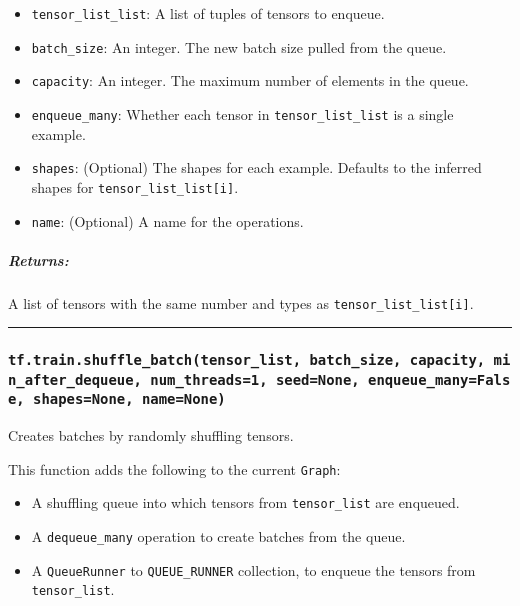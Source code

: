 \begin{itemize}
\tightlist
\item
  \texttt{tensor\_list\_list}: A list of tuples of tensors to enqueue.
\item
  \texttt{batch\_size}: An integer. The new batch size pulled from the
  queue.
\item
  \texttt{capacity}: An integer. The maximum number of elements in the
  queue.
\item
  \texttt{enqueue\_many}: Whether each tensor in
  \texttt{tensor\_list\_list} is a single example.
\item
  \texttt{shapes}: (Optional) The shapes for each example. Defaults to
  the inferred shapes for \texttt{tensor\_list\_list{[}i{]}}.
\item
  \texttt{name}: (Optional) A name for the operations.
\end{itemize}

\subparagraph{Returns: }\label{returns-55}

A list of tensors with the same number and types as
\texttt{tensor\_list\_list{[}i{]}}.

\begin{center}\rule{0.5\linewidth}{\linethickness}\end{center}

\subsubsection{\texorpdfstring{\texttt{tf.train.shuffle\_batch(tensor\_list,\ batch\_size,\ capacity,\ min\_after\_dequeue,\ num\_threads=1,\ seed=None,\ enqueue\_many=False,\ shapes=None,\ name=None)}
}{tf.train.shuffle\_batch(tensor\_list, batch\_size, capacity, min\_after\_dequeue, num\_threads=1, seed=None, enqueue\_many=False, shapes=None, name=None) }}\label{tf.train.shuffleux5fbatchtensorux5flist-batchux5fsize-capacity-minux5fafterux5fdequeue-numux5fthreads1-seednone-enqueueux5fmanyfalse-shapesnone-namenone}

Creates batches by randomly shuffling tensors.

This function adds the following to the current \texttt{Graph}:

\begin{itemize}
\tightlist
\item
  A shuffling queue into which tensors from \texttt{tensor\_list} are
  enqueued.
\item
  A \texttt{dequeue\_many} operation to create batches from the queue.
\item
  A \texttt{QueueRunner} to \texttt{QUEUE\_RUNNER} collection, to
  enqueue the tensors from \texttt{tensor\_list}.
\end{itemize}


